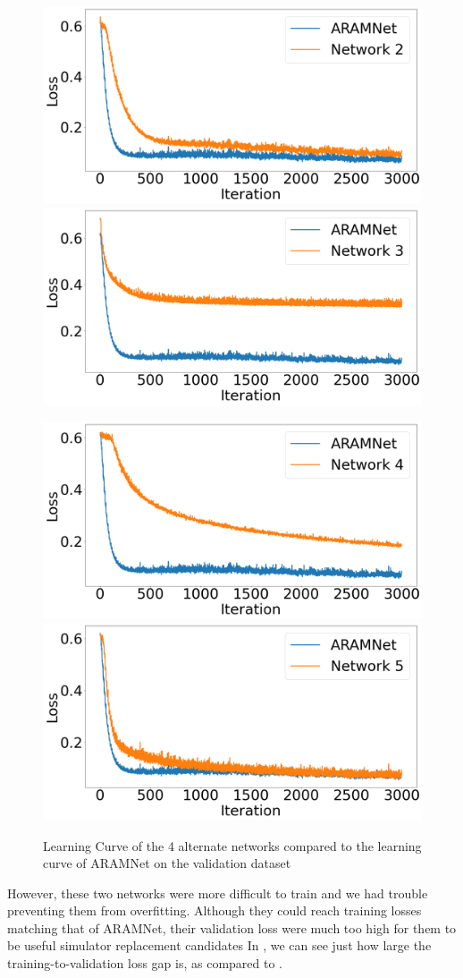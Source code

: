 \begin{figure}[htbp]
    \centering
    \begin{minipage}{\textwidth}
        \centering
        \includegraphics[width=.49\textwidth]{figures/explore-val-loss/network-2.png}\hfill
        \includegraphics[width=.49\textwidth]{figures/explore-val-loss/network-3.png}
    \end{minipage}\hfill
    \vspace{3mm}
    \begin{minipage}{\textwidth}
        \includegraphics[width=.49\textwidth]{figures/explore-val-loss/network-4.png}\hfill
        \includegraphics[width=.49\textwidth]{figures/explore-val-loss/network-5.png}
    \end{minipage}
    \label{Figure:Training-Loss-All-Networks}
    \caption{Learning Curve of the 4 alternate networks compared to the learning curve of ARAMNet on the validation dataset}
\end{figure}

However, these two networks were more difficult to train and we had trouble preventing them from overfitting.
Although they could reach training losses matching that of ARAMNet, their validation loss were much too high for them to be useful simulator replacement candidates
In , we can see just how large the training-to-validation loss gap is, as compared to .

